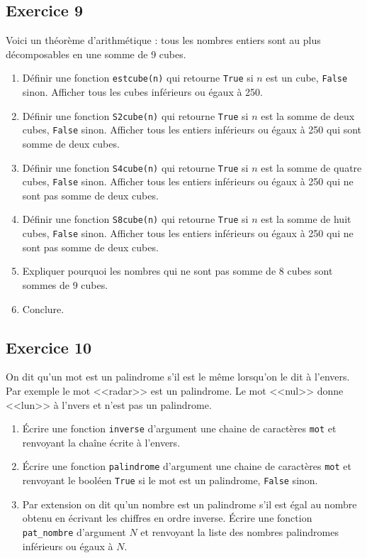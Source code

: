 \documentclass[10pt,fleqn]{article} %
\begin{document}
\begin{multicols}{2}
\subsection*{Exercice 9}
Voici un théorème d'arithmétique : tous les nombres entiers sont au plus décomposables en une somme de 9 cubes. 
\begin{enumerate}
\item Définir une fonction \texttt{estcube(n)} qui retourne \texttt{True} si $n$ est un cube, \texttt{False} sinon. Afficher tous les cubes inférieurs ou égaux à 250.
\item Définir une fonction \texttt{S2cube(n)} qui retourne \texttt{True} si $n$ est la somme de deux cubes, \texttt{False} sinon. Afficher tous les entiers inférieurs ou égaux à 250 qui sont somme de deux cubes.
\item Définir une fonction \texttt{S4cube(n)} qui retourne \texttt{True} si $n$ est la somme de quatre cubes, \texttt{False} sinon. Afficher tous les entiers inférieurs ou égaux à 250 qui ne sont pas somme de deux cubes.
\item Définir une fonction \texttt{S8cube(n)} qui retourne \texttt{True} si $n$ est la somme de huit cubes, \texttt{False} sinon. Afficher tous les entiers inférieurs ou égaux à 250 qui ne sont pas somme de deux cubes.
\item Expliquer pourquoi les nombres qui ne sont pas somme de 8 cubes sont sommes de 9 cubes. 
\item Conclure.
\end{enumerate}

\subsection*{Exercice 10}
On dit qu'un mot est un palindrome s'il est le même lorsqu'on le dit à l'envers. Par exemple le mot <<radar>> est un palindrome. Le mot <<nul>> donne <<lun>> à l'nvers et n'est pas un palindrome. 
\begin{enumerate}
\item Écrire une fonction \texttt{inverse} d'argument une chaine de caractères \texttt{mot} et renvoyant la chaîne écrite à l'envers. 
\item Écrire une fonction \texttt{palindrome} d'argument une chaine de caractères \texttt{mot} et renvoyant le booléen \texttt{True} si le mot est un palindrome, \texttt{False} sinon.
\item Par extension on dit qu'un nombre est un palindrome s'il est égal au nombre obtenu en écrivant les chiffres en ordre inverse. Écrire une fonction \texttt{pat\_nombre} d'argument $N$ et renvoyant la liste des nombres palindromes inférieurs ou égaux à $N$.
\end{enumerate}



\end{multicols}
\end{document}
